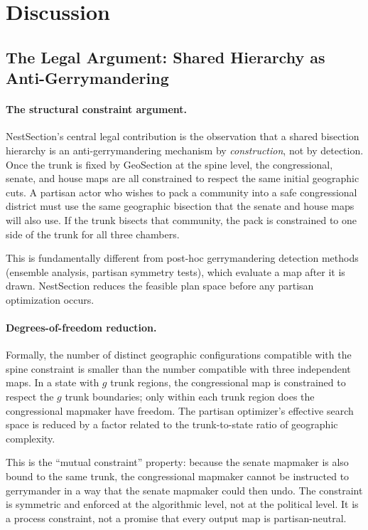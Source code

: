 \section{Discussion}
\label{sec:discussion}

\subsection{The Legal Argument: Shared Hierarchy as Anti-Gerrymandering}

\paragraph{The structural constraint argument.}
NestSection's central legal contribution is the observation that a shared
bisection hierarchy is an anti-gerrymandering mechanism by \emph{construction},
not by detection.  Once the trunk is fixed by GeoSection at the spine level,
the congressional, senate, and house maps are all constrained to respect the
same initial geographic cuts.  A partisan actor who wishes to pack a community
into a safe congressional district must use the same geographic bisection that
the senate and house maps will also use.  If the trunk bisects that community,
the pack is constrained to one side of the trunk for all three chambers.

This is fundamentally different from post-hoc gerrymandering detection methods
(ensemble analysis, partisan symmetry tests), which evaluate a map after it is
drawn.  NestSection reduces the feasible plan space before any partisan
optimization occurs.

\paragraph{Degrees-of-freedom reduction.}
Formally, the number of distinct geographic configurations compatible with the
spine constraint is smaller than the number compatible with three independent
maps.  In a state with $g$ trunk regions, the congressional map is constrained
to respect the $g$ trunk boundaries; only within each trunk region does the
congressional mapmaker have freedom.  The partisan optimizer's effective search
space is reduced by a factor related to the trunk-to-state ratio of geographic
complexity.

This is the ``mutual constraint'' property: because the senate mapmaker is also
bound to the same trunk, the congressional mapmaker cannot be instructed to gerrymander in a way
that the senate mapmaker could then undo.  The constraint is symmetric and
enforced at the algorithmic level, not at the political level. It is a process
constraint, not a promise that every output map is partisan-neutral.

